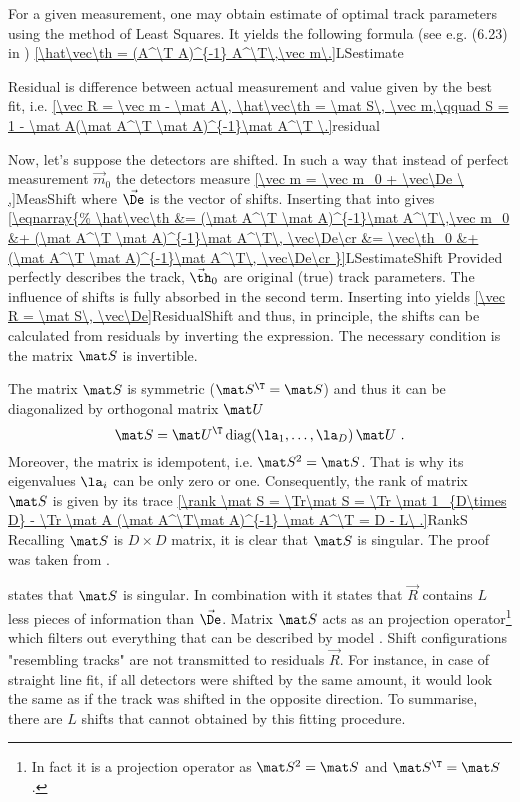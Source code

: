 For a given measurement, one may obtain estimate of optimal track parameters using the method of Least Squares. It yields the following formula (see e.g. (6.23) in )
\eqref{\hat\vec\th = (A^\T A)^{-1} A^\T\,\vec m\.}{LSestimate}

Residual is difference between actual measurement and value given by the best fit, i.e.
\eqref{\vec R = \vec m - \mat A\, \hat\vec\th = \mat S\, \vec m,\qquad S = 1 - \mat A(\mat A^\T \mat A)^{-1}\mat A^\T \.}{residual}

Now, let's suppose the detectors are shifted. In such a way that instead of perfect measurement $\vec m_0$ the detectors measure
\eqref{\vec m = \vec m_0 + \vec\De \ ,}{MeasShift}
where $\vec\De$ is the vector of shifts. Inserting that into  gives
\eqref{\eqnarray{%
\hat\vec\th &= (\mat A^\T \mat A)^{-1}\mat A^\T\,\vec m_0 &+ (\mat A^\T \mat A)^{-1}\mat A^\T\, \vec\De\cr
			&= \vec\th_0 &+ (\mat A^\T \mat A)^{-1}\mat A^\T\, \vec\De\cr
}}{LSestimateShift}
Provided  perfectly describes the track, $\vec\th_0$ are original (true) track parameters. The influence of shifts is fully absorbed in the second term. Inserting  into  yields
\eqref{\vec R = \mat S\, \vec\De}{ResidualShift}
and thus, in principle, the shifts can be calculated from residuals by inverting the expression. The necessary condition is the matrix $\mat S$ is invertible. 

The matrix $\mat S$ is symmetric ($\mat S^\T = \mat S$) and thus it can be diagonalized by orthogonal matrix $\mat U$
$$\mat S = \mat U^\T\,{\rm diag}(\la_1,\ldots,\la_D)\,\mat U\ .$$
Moreover, the matrix is idempotent, i.e. $\mat S^2 = \mat S$. That is why its eigenvalues $\la_i$ can be only zero or one. Consequently, the rank of matrix $\mat S$ is given by its trace
\eqref{\rank \mat S = \Tr\mat S = \Tr \mat 1_{D\times D} - \Tr \mat A (\mat A^\T\mat A)^{-1} \mat A^\T = D - L\ .}{RankS}
Recalling $\mat S$ is $D\times D$ matrix, it is clear that $\mat S$ is singular. The proof was taken from .

 states that $\mat S$ is singular. In combination with  it states that $\vec R$ contains $L$ less pieces of information than $\vec \De$. Matrix $\mat S$ acts as an projection operator\footnote{%
In fact it is a projection operator as $\mat S^2 = \mat S$ and $\mat S^\T = \mat S$.
}
which filters out everything that can be described by model . Shift configurations "resembling tracks" are not transmitted to residuals $\vec R$. For instance, in case of straight line fit, if all detectors were shifted by the same amount, it would look the same as if the track was shifted in the opposite direction. To summarise, there are $L$ shifts that cannot obtained by this fitting procedure.

